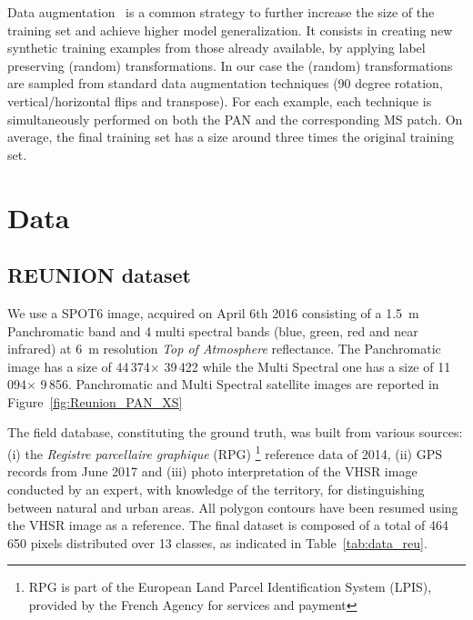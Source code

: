 \documentclass[journal]{IEEEtran}
\begin{document}
Data augmentation~\cite{abs-1712-04621} is a common strategy to further increase the size of the training set and achieve higher model generalization. It consists in creating new synthetic training examples from those already available, by applying label preserving (random) transformations. In our case the (random) transformations are sampled from standard data augmentation techniques (90 degree rotation, vertical/horizontal flips and transpose). For each example, each technique is simultaneously performed on both the PAN and the corresponding MS patch. On average, the final training set has a size around three times the original training set.


\section{Data}
\label{sec:data}
\label{sec:data}\subsection{REUNION dataset}

We use a SPOT6 image, acquired on April 6th 2016 consisting of a 1.5~m Panchromatic band and 4 multi spectral bands (blue, green, red and near infrared) at 6~m resolution \textit{Top of Atmosphere} reflectance.
The Panchromatic image has a size of 44\,374$\times$ 39\,422 while the Multi Spectral one has a size of 
11\,094$\times$ 9\,856. %
Panchromatic and Multi Spectral satellite images are reported in Figure~\ref{fig:Reunion_PAN_XS}%

The field database, constituting the ground truth, was built from various sources: (i) the \textit{Registre parcellaire graphique} (RPG) \footnote{RPG is part of the European Land Parcel Identification System (LPIS), provided by the French Agency for services and payment} reference data of 2014, (ii) GPS records from June 2017 and (iii) photo interpretation of the VHSR image conducted by an expert, with knowledge of the territory, for distinguishing between natural and urban areas. All polygon contours have been resumed using the VHSR image as a reference. The final dataset is composed of a total of 464\,650 pixels  distributed over 13 classes, as indicated in Table~\ref{tab:data_reu}.
\end{document}
